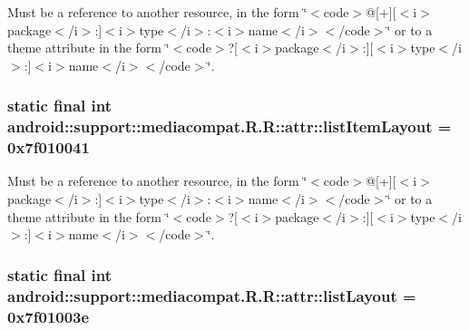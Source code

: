 Must be a reference to another resource, in the form \char`\"{}$<$code$>$@\mbox{[}+\mbox{]}\mbox{[}$<$i$>$package$<$/i$>$:\mbox{]}$<$i$>$type$<$/i$>$:$<$i$>$name$<$/i$>$$<$/code$>$\char`\"{} or to a theme attribute in the form \char`\"{}$<$code$>$?\mbox{[}$<$i$>$package$<$/i$>$:\mbox{]}\mbox{[}$<$i$>$type$<$/i$>$:\mbox{]}$<$i$>$name$<$/i$>$$<$/code$>$\char`\"{}. \hypertarget{classandroid_1_1support_1_1mediacompat_1_1_r_1_1attr_53d1b5cf7893562d845823091314ac5c}{
\subsubsection[{listItemLayout}]{\setlength{\rightskip}{0pt plus 5cm}static final int android::support::mediacompat.R.R::attr::listItemLayout = 0x7f010041}}
\label{classandroid_1_1support_1_1mediacompat_1_1_r_1_1attr_53d1b5cf7893562d845823091314ac5c}


Must be a reference to another resource, in the form \char`\"{}$<$code$>$@\mbox{[}+\mbox{]}\mbox{[}$<$i$>$package$<$/i$>$:\mbox{]}$<$i$>$type$<$/i$>$:$<$i$>$name$<$/i$>$$<$/code$>$\char`\"{} or to a theme attribute in the form \char`\"{}$<$code$>$?\mbox{[}$<$i$>$package$<$/i$>$:\mbox{]}\mbox{[}$<$i$>$type$<$/i$>$:\mbox{]}$<$i$>$name$<$/i$>$$<$/code$>$\char`\"{}. \hypertarget{classandroid_1_1support_1_1mediacompat_1_1_r_1_1attr_786d3d808a38c3da7e3f411be38cb65b}{
\subsubsection[{listLayout}]{\setlength{\rightskip}{0pt plus 5cm}static final int android::support::mediacompat.R.R::attr::listLayout = 0x7f01003e}}
\label{classandroid_1_1support_1_1mediacompat_1_1_r_1_1attr_786d3d808a38c3da7e3f411be38cb65b}


